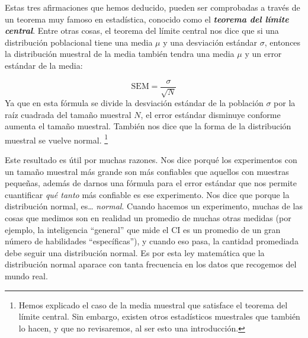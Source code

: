 \documentclass[spanish,]{book}
\let\rmarkdownfootnote\footnote%
\def\footnote{\protect\rmarkdownfootnote}
\begin{document}
Estas tres afirmaciones que hemos deducido, pueden ser comprobadas a
través de un teorema muy famoso en estadística, conocido como el
\textbf{\emph{teorema del límite central}}. Entre otras cosas, el
teorema del límite central nos dice que si una distribución poblacional
tiene una media \(\mu\) y una desviación estándar \(\sigma\), entonces
la distribución muestral de la media también tendra una media \(\mu\) y
un error estándar de la media:

\[
\mbox{SEM} = \frac{\sigma}{ \sqrt{N} }
\] Ya que en esta fórmula se divide la desviación estándar de la
población \(\sigma\) por la raíz cuadrada del tamaño muestral \(N\), el
error estándar disminuye conforme aumenta el tamaño muestral. También
nos dice que la forma de la distribución muestral se vuelve normal.
\footnote{Hemos explicado el caso de la media muestral que satisface el
  teorema del límite central. Sin embargo, existen otros estadísticos
  muestrales que también lo hacen, y que no revisaremos, al ser esto una
  introducción.}

Este resultado es útil por muchas razones. Nos dice porqué los
experimentos con un tamaño muestral más grande son más confiables que
aquellos con muestras pequeñas, además de darnos una fórmula para el
error estándar que nos permite cuantificar \emph{qué tanto} más
confiable es ese experimento. Nos dice que porque la distribución
normal, es\ldots{} \emph{normal}. Cuando hacemos un experimento, muchas
de las cosas que medimos son en realidad un promedio de muchas otras
medidas (por ejemplo, la inteligencia ``general'' que mide el CI es un
promedio de un gran número de habilidades ``específicas''), y cuando eso
pasa, la cantidad promediada debe seguir una distribución normal. Es por
esta ley matemática que la distribución normal aparace con tanta
frecuencia en los datos que recogemos del mundo real.


\end{document}
